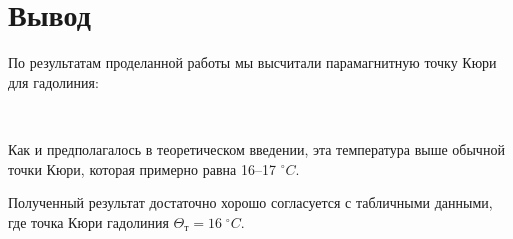 \documentclass[12pt]{kiarticle} %
\begin{document}
\section{Вывод}

По результатам проделанной работы мы высчитали парамагнитную точку Кюри для гадолиния:

\begin{center}
	{} \\
\end{center} 

Как и предполагалось в теоретическом введении, эта температура выше обычной точки Кюри, которая примерно равна 16--17 $ ^\circ C $. 

Полученный результат достаточно хорошо согласуется с табличными данными, где точка Кюри гадолиния $ \Theta_т = 16 \; ^\circ C $.
\end{document}
